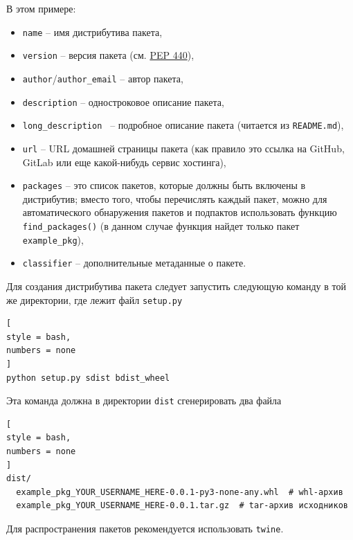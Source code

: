 \documentclass[%
	11pt,
	a4paper,
	utf8,
		]{article}
\begin{document}
В этом примере:
\begin{itemize}
	\item \texttt{name} -- имя дистрибутива пакета,
	
	\item \texttt{version} -- версия пакета (см. \href{https://www.python.org/dev/peps/pep-0440/}{PEP 440}),
	
	\item \texttt{author}/\texttt{author\_email} -- автор пакета,
	
	\item \texttt{description} -- одностроковое описание пакета,
	
	\item \texttt{long\_description } -- подробное описание пакета (читается из \texttt{README.md}),
	
	\item \texttt{url} -- URL домашней страницы пакета (как правило это ссылка на GitHub, GitLab или еще какой-нибудь сервис хостинга),
	
	\item \texttt{packages} -- это список пакетов, которые должны быть включены в дистрибутив; вместо того, чтобы перечислять каждый пакет, можно для автоматического обнаружения пакетов и подпактов использовать функцию \texttt{find\_packages()} (в данном случае функция найдет только пакет \texttt{example\_pkg}),
	
	\item \texttt{classifier} -- дополнительные метаданные о пакете.
\end{itemize}

Для создания дистрибутива пакета следует запустить следующую команду в той же директории, где лежит файл \texttt{setup.py}
\begin{lstlisting}[
style = bash,
numbers = none	
]
python setup.py sdist bdist_wheel
\end{lstlisting}

Эта команда должна в директории \texttt{dist} сгенерировать два файла
\begin{lstlisting}[
style = bash,
numbers = none	
]
dist/
  example_pkg_YOUR_USERNAME_HERE-0.0.1-py3-none-any.whl  # whl-архив
  example_pkg_YOUR_USERNAME_HERE-0.0.1.tar.gz  # tar-архив исходников
\end{lstlisting}

Для распространения пакетов рекомендуется использовать \texttt{twine}.
\end{document}
